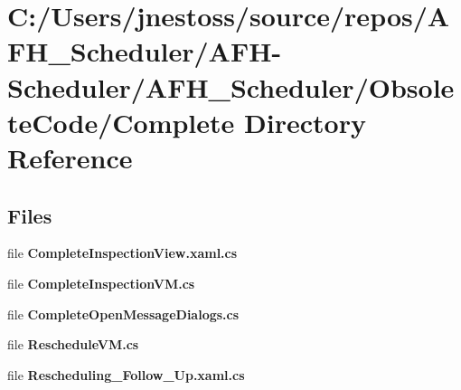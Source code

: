 \section{C\+:/\+Users/jnestoss/source/repos/\+A\+F\+H\+\_\+\+Scheduler/\+A\+F\+H-\/\+Scheduler/\+A\+F\+H\+\_\+\+Scheduler/\+Obsolete\+Code/\+Complete Directory Reference}
\label{dir_a3e00951de43ce140a75d2c4565b3a8b}
\subsection*{Files}
\begin{DoxyCompactItemize}
\item 
file \textbf{ Complete\+Inspection\+View.\+xaml.\+cs}
\item 
file \textbf{ Complete\+Inspection\+V\+M.\+cs}
\item 
file \textbf{ Complete\+Open\+Message\+Dialogs.\+cs}
\item 
file \textbf{ Reschedule\+V\+M.\+cs}
\item 
file \textbf{ Rescheduling\+\_\+\+Follow\+\_\+\+Up.\+xaml.\+cs}
\end{DoxyCompactItemize}
